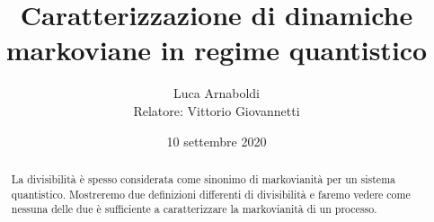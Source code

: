 \documentclass[a4paper]{article}
\title{Caratterizzazione di dinamiche markoviane in regime quantistico}
\author{Luca Arnaboldi \\
        {\small Relatore: Vittorio Giovannetti}}
\date{10 settembre 2020}
\begin{document}
\maketitle

\begin{abstract}
La divisibilità è spesso considerata come sinonimo di markovianità per un sistema quantistico. Mostreremo due definizioni differenti di divisibilità e faremo vedere come nessuna delle due è sufficiente a caratterizzare la markovianità di un processo.
\end{abstract}
\vspace{0.5em}


\printbibliography
\end{document}
